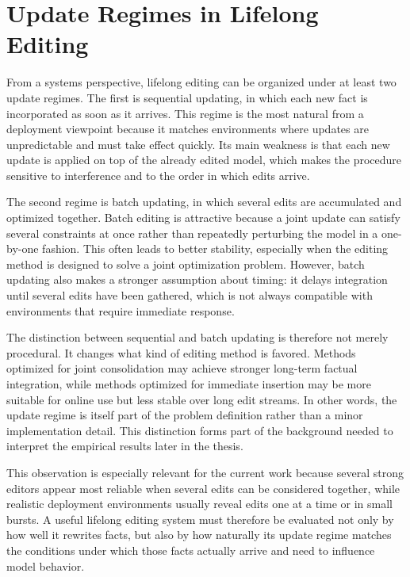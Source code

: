 \section{Update Regimes in Lifelong Editing}

From a systems perspective, lifelong editing can be organized under at least two update regimes. The first is sequential updating, in which each new fact is incorporated as soon as it arrives. This regime is the most natural from a deployment viewpoint because it matches environments where updates are unpredictable and must take effect quickly. Its main weakness is that each new update is applied on top of the already edited model, which makes the procedure sensitive to interference and to the order in which edits arrive.

The second regime is batch updating, in which several edits are accumulated and optimized together. Batch editing is attractive because a joint update can satisfy several constraints at once rather than repeatedly perturbing the model in a one-by-one fashion. This often leads to better stability, especially when the editing method is designed to solve a joint optimization problem. However, batch updating also makes a stronger assumption about timing: it delays integration until several edits have been gathered, which is not always compatible with environments that require immediate response.

The distinction between sequential and batch updating is therefore not merely procedural. It changes what kind of editing method is favored. Methods optimized for joint consolidation may achieve stronger long-term factual integration, while methods optimized for immediate insertion may be more suitable for online use but less stable over long edit streams. In other words, the update regime is itself part of the problem definition rather than a minor implementation detail. This distinction forms part of the background needed to interpret the empirical results later in the thesis.

This observation is especially relevant for the current work because several strong editors appear most reliable when several edits can be considered together, while realistic deployment environments usually reveal edits one at a time or in small bursts. A useful lifelong editing system must therefore be evaluated not only by how well it rewrites facts, but also by how naturally its update regime matches the conditions under which those facts actually arrive and need to influence model behavior.

